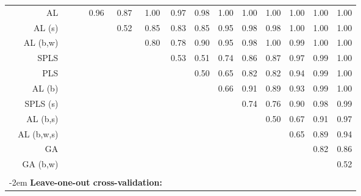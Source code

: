 \documentclass[authoryear,review, 12pt]{elsarticle}
\begin{document}
\begin{table}[h!]
{\begin{tabular}{rccccccccccccc}
  AL &  &  & 0.96 & 0.87 & 1.00 & 0.97 & 0.98 & 1.00 & 1.00 & 1.00 & 1.00 & 1.00 & 1.00 \\ 
  AL (s) &  &  &  & 0.52 & 0.85 & 0.83 & 0.85 & 0.95 & 0.98 & 0.98 & 1.00 & 1.00 & 1.00 \\ 
  AL (b,w) &  &  &  &  & 0.80 & 0.78 & 0.90 & 0.95 & 0.98 & 1.00 & 0.99 & 1.00 & 1.00 \\ 
  SPLS &  &  &  &  &  & 0.53 & 0.51 & 0.74 & 0.86 & 0.87 & 0.97 & 0.99 & 1.00 \\ 
  PLS &  &  &  &  &  &  & 0.50 & 0.65 & 0.82 & 0.82 & 0.94 & 0.99 & 1.00 \\ 
  AL (b) &  &  &  &  &  &  &  & 0.66 & 0.91 & 0.89 & 0.93 & 0.99 & 1.00 \\ 
  SPLS (s) &  &  &  &  &  &  &  &  & 0.74 & 0.76 & 0.90 & 0.98 & 0.99 \\ 
  AL (b,s) &  &  &  &  &  &  &  &  &  & 0.50 & 0.67 & 0.91 & 0.97 \\ 
  AL (b,w,s) &  &  &  &  &  &  &  &  &  &  & 0.65 & 0.89 & 0.94 \\ 
  GA &  &  &  &  &  &  &  &  &  &  &  & 0.82 & 0.86 \\ 
  GA (b,w) &  &  &  &  &  &  &  &  &  &  &  &  & 0.52 \\ 
  & & & & & & & & & & & & & \\
\multicolumn{6}{l}{\kern-2em \textbf{Leave-one-out cross-validation:}} & & & & & & & & \\

\end{tabular}}
\end{table}
\end{document}
